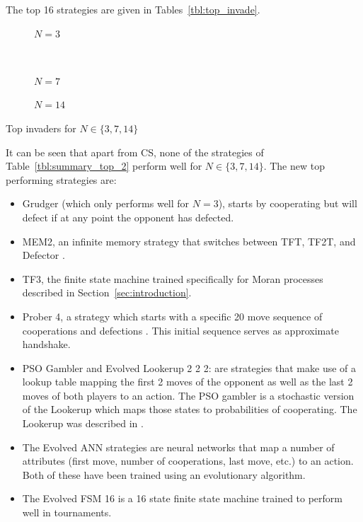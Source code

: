 \documentclass{article}
\begin{document}
The top 16 strategies are given in Tables~\ref{tbl:top_invade}.

\begin{table}[!hbtp]
    \centering
    \scriptsize
    \begin{subfigure}[t]{.5\textwidth}
        \centering
        
        \caption{\(N=3\)}
    \end{subfigure}%
    ~
    \begin{subfigure}[t]{.5\textwidth}
        \centering
        
        \caption{\(N=7\)}
    \end{subfigure}

    \begin{subfigure}[t]{.3\textwidth}
        \centering
        
        \caption{\(N=14\)}
    \end{subfigure}
    \caption{Top invaders for \(N\in\{3, 7, 14\}\)}
    \label{tbl:top_invade}
\end{table}

It can be seen that apart from CS, none of the strategies
of Table~\ref{tbl:summary_top_2} perform well for \(N\in\{3, 7, 14\}\). The new
top performing strategies are:

\begin{itemize}
    \item Grudger (which only performs well for \(N=3\)), starts by cooperating
        but will defect if at any point the opponent has defected.
    \item MEM2, an infinite memory strategy that switches between TFT, TF2T, and
        Defector \cite{Li2014}.
    \item TF3, the finite state machine trained specifically for Moran processes
        described in Section~\ref{sec:introduction}.
    \item Prober 4, a strategy which starts with a specific 20 move sequence of
        cooperations and defections \cite{Prison1998}. This initial sequence serves
        as approximate handshake.
    \item  PSO Gambler and Evolved Lookerup 2 2 2: are strategies that make use
        of a lookup table mapping the first 2 moves of the opponent as well as
        the last 2 moves of both players to an action. The PSO gambler is a
        stochastic version of the Lookerup which maps those states to probabilities of cooperating. The Lookerup was described in \cite{Knight2016}.
    \item The Evolved ANN strategies are neural networks that map a number of
	    attributes (first move, number of cooperations, last move, etc.) to
	    an action. Both of these have been trained using an evolutionary
	    algorithm.
    \item The Evolved FSM 16 is a 16 state finite state machine trained to
        perform well in tournaments.
\end{itemize}
\end{document}
